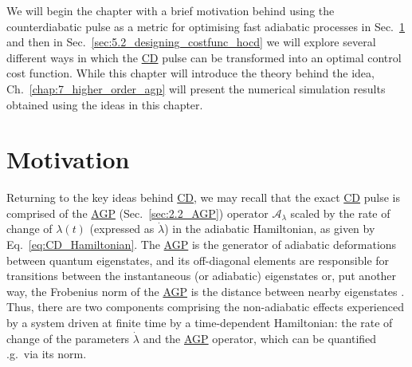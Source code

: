 \documentclass[a4paper,oneside,11pt]{book}
\newcommand{\AGP}[1]{\mathcal{A}_{#1}}
\newcommand{\dotlambda}{\dot{\lambda}}
\newcommand{\acrref}[1]{\hyperref[acr:#1]{#1}}
\begin{document}
We will begin the chapter with a brief motivation behind using the counterdiabatic pulse as a metric for optimising fast adiabatic processes in Sec.~\ref{sec:5.1_motivation} and then in Sec.~\ref{sec:5.2_designing_costfunc_hocd} we will explore several different ways in which the \acrref{CD} pulse can be transformed into an optimal control cost function. While this chapter will introduce the theory behind the idea, Ch.~\ref{chap:7_higher_order_agp} will present the numerical simulation results obtained using the ideas in this chapter.

\section{Motivation}\label{sec:5.1_motivation}

Returning to the key ideas behind \acrref{CD}, we may recall that the exact \acrref{CD} pulse is comprised of the \acrref{AGP} (Sec.~\ref{sec:2.2_AGP}) operator $\AGP{\lambda}$ scaled by the rate of change of $\lambda(t)$ (expressed as $\dotlambda$) in the adiabatic Hamiltonian, as given by Eq.~\eqref{eq:CD_Hamiltonian}. The \acrref{AGP} is the generator of adiabatic deformations between quantum eigenstates, and its off-diagonal elements are responsible for transitions between the instantaneous (or adiabatic) eigenstates or, put another way, the Frobenius norm of the \acrref{AGP} is the distance between nearby eigenstates \cite{pandey_adiabatic_2020, nandy_delayed_2022}. Thus, there are two components comprising the non-adiabatic effects experienced by a system driven at finite time by a time-dependent Hamiltonian: the rate of change of the parameters $\dotlambda$ and the \acrref{AGP} operator, which can be quantified \@e.g.~via its norm. 
\end{document}
